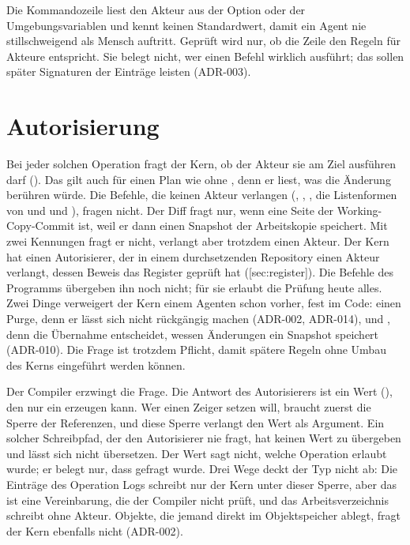 Die Kommandozeile liest den Akteur aus der Option 
oder der Umgebungsvariablen 
und kennt keinen Standardwert,
damit ein Agent nie stillschweigend als Mensch auftritt.
Geprüft wird nur, ob die Zeile den Regeln für Akteure entspricht.
Sie belegt nicht, wer einen Befehl wirklich ausführt;
das sollen später Signaturen der Einträge leisten (ADR-003).

\section{Autorisierung}

Bei jeder solchen Operation fragt der Kern,
ob der Akteur sie am Ziel ausführen darf ().
Das gilt auch für einen Plan wie  ohne ,
denn er liest, was die Änderung berühren würde.
Die Befehle, die keinen Akteur verlangen
(, , , die Listenformen von  und 
und ), fragen nicht.
Der Diff fragt nur, wenn eine Seite der Working-Copy-Commit ist,
weil er dann einen Snapshot der Arbeitskopie speichert.
Mit zwei Kennungen fragt er nicht, verlangt aber trotzdem einen Akteur.
Der Kern hat einen Autorisierer, der in einem durchsetzenden Repository einen Akteur verlangt,
dessen Beweis das Register geprüft hat ([sec:register]).
Die Befehle des Programms übergeben ihn noch nicht; für sie erlaubt die Prüfung heute alles.
Zwei Dinge verweigert der Kern einem Agenten schon vorher, fest im Code:
einen Purge, denn er lässt sich nicht rückgängig machen (ADR-002, ADR-014),
und , denn die Übernahme entscheidet, wessen Änderungen ein Snapshot speichert
(ADR-010).
Die Frage ist trotzdem Pflicht,
damit spätere Regeln ohne Umbau des Kerns eingeführt werden können.

Der Compiler erzwingt die Frage.
Die Antwort des Autorisierers ist ein Wert (),
den nur ein  erzeugen kann.
Wer einen Zeiger setzen will, braucht zuerst die Sperre der Referenzen,
und diese Sperre verlangt den Wert als Argument.
Ein solcher Schreibpfad, der den Autorisierer nie fragt, hat keinen Wert zu übergeben
und lässt sich nicht übersetzen.
Der Wert sagt nicht, welche Operation erlaubt wurde;
er belegt nur, dass gefragt wurde.
Drei Wege deckt der Typ nicht ab:
Die Einträge des Operation Logs schreibt nur der Kern unter dieser Sperre,
aber das ist eine Vereinbarung, die der Compiler nicht prüft,
und das Arbeitsverzeichnis schreibt  ohne Akteur.
Objekte, die jemand direkt im Objektspeicher ablegt, fragt der Kern ebenfalls nicht (ADR-002).

